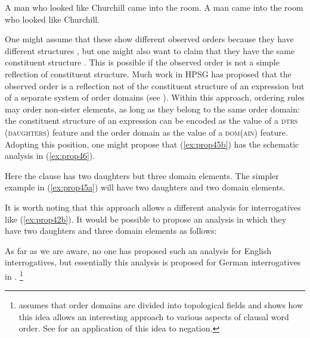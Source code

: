 \documentclass[output=paper
	        ,collection
	        ,collectionchapter
 	        ,biblatex
                ,babelshorthands
                ,newtxmath
                ,draftmode
                ,colorlinks, citecolor=brown
]{langscibook}
\begin{document}
\eal\label{ex:prop45}
\ex\label{ex:prop45a}
A man who looked like Churchill came into the room.
\ex\label{ex:prop45b}
A man came into the room who looked like Churchill.
\zl

\noindent
One might assume that these show different observed orders because they have different structures
\citep{Kiss2005a}, but one might also want to claim that they have the same constituent structure
\citep{KP95a}. This is possible if the observed order is not a simple reflection of constituent
structure. Much work in HPSG has proposed that the observed order is a reflection not of the
constituent structure of an expression but of a separate system of order domains (see
\citealp{Reape94a,Babel,Kathol2000a}). Within this approach, ordering rules may order non-sister
elements, as long as they belong to the same order domain: the constituent structure of an
expression can be encoded as the value of a \textsc{dtrs (daughters)} feature and the order domain
as the value of a \textsc{dom(ain)} feature. Adopting this position, one might propose that
(\ref{ex:prop45b}) has the schematic analysis in (\ref{ex:prop46}). 

\ea\label{ex:prop46}
\z

\noindent
Here the clause has two daughters but three domain elements. The simpler example in (\ref{ex:prop45a}) will have two daughters and two domain elements.

It is worth noting that this approach allows a different analysis for interrogatives like (\ref{ex:prop42b}). It would be possible to propose an analysis in which they have two daughters and three domain elements as follows:

\ea\label{ex:prop47}
\z

\noindent
As far as we are aware, no one has proposed such an analysis for English interrogatives, but essentially this analysis is proposed for German interrogatives in \citet[81]{Kathol2000a}.%
%
\footnote{\citet{Kathol2000a} assumes that order domains are divided into topological fields and shows how this idea allows an interesting approach to various aspects of clausal word order. See \citet{Borsley:06} for an application of this idea to negation.}
%
\end{document}
